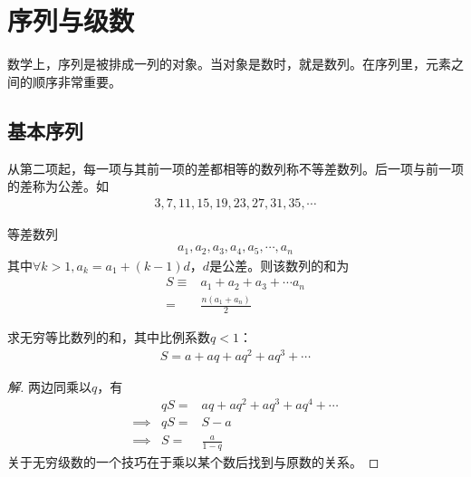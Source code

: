 
\chapter{序列与级数}
\label{chap:series}

数学上，序列是被排成一列的对象。当对象是数时，就是数列。在序列里，元素之间的顺序非常重要。

\section{基本序列}
\label{sec:basic-series}

\begin{example}
  从第二项起，每一项与其前一项的差都相等的数列称不等差数列。后一项与前一项的差称为公差。如
  \begin{align*}
    3,7,11,15,19,23,27,31,35,\cdots
  \end{align*}
\end{example}

\begin{example}等差数列
  \begin{align*}
    a_1, a_2, a_3, a_4, a_5, \cdots, a_n
  \end{align*}
  其中$\forall k>1, a_k=a_1 + (k-1)d$，$d$是公差。则该数列的和为
  \begin{align*}
    S\equiv & a_1 + a_2 + a_3 + \cdots a_n\\
          = & \frac{n(a_1+a_n)}{2}
  \end{align*}
\end{example}

\begin{example}
  求无穷等比数列的和，其中比例系数$q<1$：
  \begin{align*}
    S=a + aq + aq^2 + aq^3 + \cdots
  \end{align*}
\end{example}
\begin{proof}[解]
  两边同乘以$q$，有
  \begin{eqnarray*}
            & qS=& aq + aq^2 + aq^3 + aq^4 + \cdots\\
    \implies& qS=& S - a\\
    \implies&  S=& \frac{a}{1-q}
  \end{eqnarray*}
  关于无穷级数的一个技巧在于乘以某个数后找到与原数的关系。
\end{proof}

